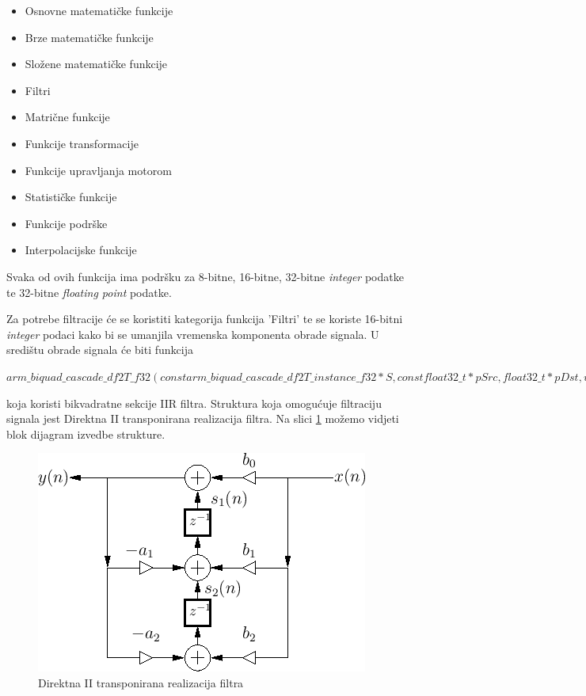\documentclass[times, utf8, diplomski]{fer}
\begin{document}
\begin{itemize}
\item Osnovne matematičke funkcije
\item Brze matematičke funkcije
\item Složene matematičke funkcije
\item Filtri
\item Matrične funkcije
\item Funkcije transformacije
\item Funkcije upravljanja motorom
\item Statističke funkcije
\item Funkcije podrške
\item Interpolacijske funkcije
\end{itemize}

Svaka od ovih funkcija ima podršku za 8-bitne, 16-bitne, 32-bitne \textit{integer} podatke te 32-bitne \textit{floating point} podatke.

Za potrebe filtracije će se koristiti kategorija funkcija 'Filtri' te se koriste 16-bitni \textit{integer} podaci kako bi se umanjila vremenska komponenta obrade signala. U središtu obrade signala će biti funkcija 

\textit{$arm\_biquad\_cascade\_df2T\_f32 (const arm\_biquad\_cascade\_df2T\_instance\_f32 *S, const float32\_t *pSrc, float32\_t *pDst, uint32\_t blockSize)$} 

koja koristi bikvadratne sekcije IIR filtra. Struktura koja omogućuje filtraciju signala jest Direktna II transponirana realizacija filtra. Na slici \ref{df2t} možemo vidjeti blok dijagram izvedbe strukture.

\begin{figure}[hbt!]
 \centering
 \includegraphics[scale=0.6]{photos/df2t.png}
 \caption{Direktna II transponirana realizacija filtra}
 \label{df2t}
\end{figure}
\end{document}

